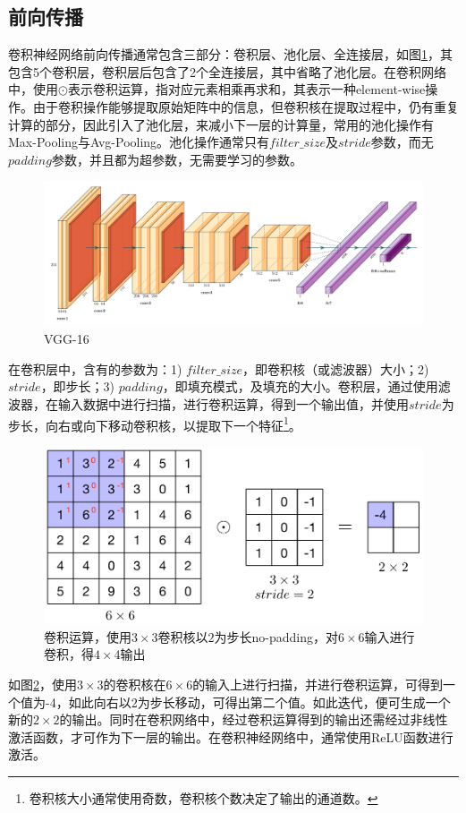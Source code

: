 \subsection{前向传播}
卷积神经网络前向传播通常包含三部分：卷积层、池化层、全连接层，如图\ref{fig:vgg16-net}，其包含5个卷积层，卷积层后包含了2个全连接层，其中省略了池化层。在卷积网络中，使用$\odot$表示卷积运算，指对应元素相乘再求和，其表示一种element-wise操作。由于卷积操作能够提取原始矩阵中的信息，但卷积核在提取过程中，仍有重复计算的部分，因此引入了池化层，来减小下一层的计算量，常用的池化操作有Max-Pooling与Avg-Pooling。池化操作通常只有$filter\_size$及$stride$参数，而无$padding$参数，并且都为超参数，无需要学习的参数。
\begin{figure}[htbp]
  \centering
  \includegraphics[width=\textwidth]{figures/vgg16.pdf}
  \caption{VGG-16}
  \label{fig:vgg16-net}
\end{figure}

在卷积层中，含有的参数为：1) $filter\_size$，即卷积核（或滤波器）大小；2) $stride$，即步长；3) $padding$，即填充模式，及填充的大小。卷积层，通过使用滤波器，在输入数据中进行扫描，进行卷积运算，得到一个输出值，并使用$stride$为步长，向右或向下移动卷积核，以提取下一个特征\footnote{卷积核大小通常使用奇数，卷积核个数决定了输出的通道数。}。
\begin{figure}[htbp]
  \centering
  \includegraphics[width=.9\textwidth]{figures/convolutional-operation.pdf}
  \caption{卷积运算，使用$3\times 3$卷积核以$2$为步长no-padding，对$6\times 6$输入进行卷积，得$4\times 4$输出}
  \label{fig:convolotional-operation}
\end{figure}
如图\ref{fig:convolotional-operation}，使用$3\times 3$的卷积核在$6 \times 6$的输入上进行扫描，并进行卷积运算，可得到一个值为-4，如此向右以2为步长移动，可得出第二个值。如此迭代，便可生成一个新的$2 \times 2$的输出。同时在卷积网络中，经过卷积运算得到的输出还需经过非线性激活函数，才可作为下一层的输出。在卷积神经网络中，通常使用ReLU函数进行激活。


